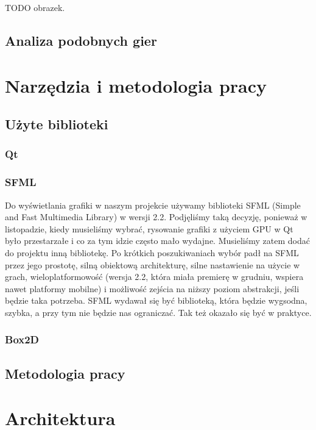\documentclass[licencjacka]{pracamgr}
\begin{document}
    TODO obrazek.

  \section{Analiza podobnych gier}

\chapter{Narzędzia i metodologia pracy}
  \section{Użyte biblioteki}
    \subsection{Qt}

    \subsection{SFML}
    Do wyświetlania grafiki w naszym projekcie używamy biblioteki SFML (Simple and Fast Multimedia Library) w wersji
    2.2. Podjęliśmy taką decyzję, ponieważ w listopadzie, kiedy musieliśmy wybrać, rysowanie grafiki z użyciem GPU w Qt
    było przestarzałe i co za tym idzie często mało wydajne. Musieliśmy zatem dodać do projektu inną bibliotekę. Po
    krótkich poszukiwaniach wybór padł na SFML przez jego prostotę, silną obiektową architekturę, silne nastawienie na
    użycie w grach, wieloplatformowość (wersja 2.2, która miała premierę w grudniu, wspiera nawet platformy mobilne) i
    możliwość zejścia na niższy poziom abstrakcji, jeśli będzie taka potrzeba. SFML wydawał się być biblioteką, która
    będzie wygsodna, szybka, a przy tym nie będzie nas ograniczać. Tak też okazało się być w praktyce.

    \subsection{Box2D}

  \section{Metodologia pracy}

\chapter{Architektura}
\end{document}
